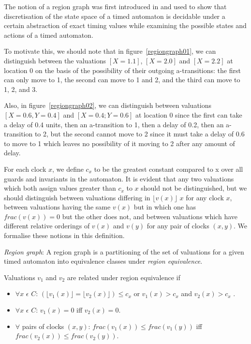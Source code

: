 \documentclass[a4paper]{llncs}
\begin{document}
The notion of a region graph was first introduced in
\cite{Alur94atheory} and used to show that discretisation of the state
space of a timed automaton is decidable under a certain abstraction of
exact timing values while examining the possible states and actions of
a timed automaton.

To motivate this, we should note that in figure~\ref{regiongraph01}, we can distinguish
between the valuations $[X = 1.1]$, $[X = 2.0]$ and $[X = 2.2]$ at
location 0 on the
basis of the possibility of their outgoing a-transitions: the first can
only move to 1, the second can move to 1 and 2, and the third can move
to 1, 2, and 3.

Also, in figure~\ref{regiongraph02}, we can distinguish between
valuations $[X = 0.6, Y = 0.4]$ and $[X = 0.4; Y = 0.6]$ at location 0
since the first can take a delay of 0.4 units, then an a-transition to
1, then a delay of 0.2, then an a-transition to 2, but the second
cannot move to 2 since it must take a delay of 0.6 to move to 1 which
leaves no possibility of it moving to 2 after any amount of delay.

For each clock $x$, we define $c_x$ to be the
greatest constant compared to x over all guards and invariants in the
automaton. It is evident that any two valuations which both assign
values greater than $c_x$ to $x$ should not be distinguished, but we should
distinguish between valuations differing in $\lfloor v(x)\rfloor$ $x$
for any clock $x$, between valuations having the same $v(x)$
but in which one has $frac(v(x))=0$ but the other does not,
and between valuations which have different relative orderings of
$v(x)$ and $v(y)$ for any pair of clocks $(x, y)$. We formalise these
notions in this definition.

\begin{definition}
  \emph{Region graph}: A region graph is a partitioning of the set of
  valuations for a given timed automaton into equivalence
  classes under \emph{region equivalence}.

  Valuations $v_1$ and $v_2$ are related under region equivalence if 
  \begin{itemize}
    \item $\forall x$ $\epsilon$ $C$: $(\lfloor v_1(x) \rfloor = \lfloor
      v_2(x) \rfloor) \leq c_x$ or $v_1(x) > c_x$ and $v_2(x) > c_x$ .
    \item $\forall x$ $\epsilon$ $C$: $v_1(x) = 0$ iff $v_2(x) = 0$.
    \item $\forall$ pairs of clocks $(x, y)$: $frac(v_1(x)) \leq
      frac(v_1(y))$ iff $frac(v_2(x)) \leq frac(v_2(y))$.
  \end{itemize}
\end{definition}
\end{document}

